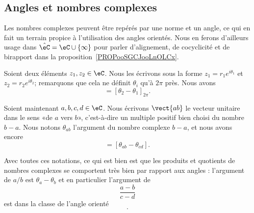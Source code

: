 \subsection{Angles et nombres complexes}
\label{SUBSECooKNUVooUBKaWm}

Les nombres complexes peuvent être repérés par une norme et un angle, ce qui en fait un terrain propice à l'utilisation des angles orientés. Nous en ferons d'ailleurs usage dans \( \hat\eC=\eC\cup\{ \infty \}\) pour parler d'alignement, de cocyclicité et de birapport dans la proposition~\ref{PROPooSGCJooLnOLCx}.

Soient deux éléments \( z_1,z_2\in \eC\). Nous les écrivons sous la forme \( z_1=r_1 e^{i\theta_1}\) et \( z_2=r_2 e^{i\theta_2}\); remarquons que cela ne définit \( \theta_i\) qu'à \( 2\pi\) près. Nous avons
\begin{equation}
    [z_1,z_2]=[\theta_2-\theta_1]_{2\pi}.
\end{equation}

Soient maintenant \( a,b,c,d\in \eC\). Nous écrivons \( \vect{ ab }\) le vecteur unitaire dans le sens «de \( a\) vers \( b\)», c'est-à-dire un multiple positif bien choisi du nombre \( b-a\). Nous notons \( \theta_{ab}\) l'argument du nombre complexe \( b-a\), et nous avons encore
\begin{equation}
    [\vect{ ab },\vect{ cd }]=[\theta_{ab}-\theta_{cd}].
\end{equation}

Avec toutes ces notations, ce qui est bien est que les produits et quotients de nombres complexes se comportent très bien par rapport aux angles : l'argument de \( a/b\) est \( \theta_a-\theta_b\) et en particulier l'argument de
\begin{equation}
    \frac{ a-b }{ c-d }
\end{equation}
est dans la classe de l'angle orienté
\begin{equation}
    [\vect{ ba },\vect{ dc }].
\end{equation}


